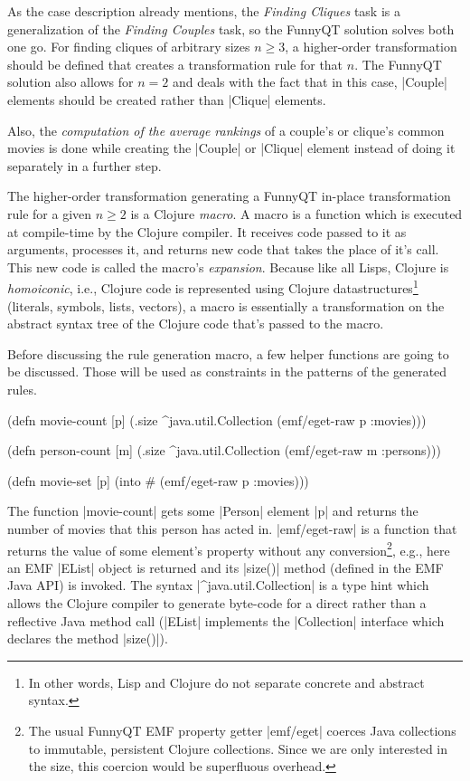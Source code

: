 \documentclass[a4paper]{article}
\newcommand{\code}{\clojureinline}
\begin{document}
As the case description already mentions, the \emph{Finding Cliques} task is a
generalization of the \emph{Finding Couples} task, so the FunnyQT solution
solves both one go.  For finding cliques of arbitrary sizes \(n \geq 3\),
a higher-order transformation should be defined that creates a transformation
rule for that \(n\).
The FunnyQT solution also allows for \(n = 2\)
and deals with the fact that in this case, \code|Couple| elements should be
created rather than \code|Clique| elements.

Also, the \emph{computation of the average rankings} of a couple's or clique's
common movies is done while creating the \code|Couple| or \code|Clique| element
instead of doing it separately in a further step.

The higher-order transformation generating a FunnyQT in-place transformation
rule for a given \(n \geq 2\)
is a Clojure \emph{macro}.  A macro is a function which is executed at
compile-time by the Clojure compiler.  It receives code passed to it as
arguments, processes it, and returns new code that takes the place of it's
call.  This new code is called the macro's \emph{expansion}.  Because like all
Lisps, Clojure is \emph{homoiconic}, i.e., Clojure code is represented using
Clojure datastructures\footnote{In other words, Lisp and Clojure do not
  separate concrete and abstract syntax.} (literals, symbols, lists, vectors),
a macro is essentially a transformation on the abstract syntax tree of the
Clojure code that's passed to the macro.

Before discussing the rule generation macro, a few helper functions are going
to be discussed.  Those will be used as constraints in the patterns of the
generated rules.

\begin{clojurecode}
(defn movie-count [p]
  (.size ^java.util.Collection (emf/eget-raw p :movies)))

(defn person-count [m]
  (.size ^java.util.Collection (emf/eget-raw m :persons)))

(defn movie-set [p]
  (into #{} (emf/eget-raw p :movies)))
\end{clojurecode}

The function \code|movie-count| gets some \code|Person| element \code|p| and
returns the number of movies that this person has acted in.
\code|emf/eget-raw| is a function that returns the value of some element's
property without any conversion\footnote{The usual FunnyQT EMF property getter
  \code|emf/eget| coerces Java collections to immutable, persistent Clojure
  collections.  Since we are only interested in the size, this coercion would
  be superfluous overhead.}, e.g., here an EMF \code|EList| object is returned
and its \code|size()| method (defined in the EMF Java API) is invoked.  The
syntax \code|^java.util.Collection| is a type hint which allows the Clojure
compiler to generate byte-code for a direct rather than a reflective Java
method call (\code|EList| implements the \code|Collection| interface which
declares the method \code|size()|).
\end{document}
